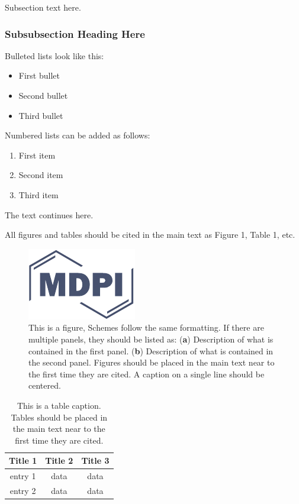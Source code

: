 \documentclass[sensors,article,submit,moreauthors,pdftex]{mdpi}
\providecommand{\tightlist}{%
  \setlength{\itemsep}{0pt}\setlength{\parskip}{4pt}}
\begin{document}
Subsection text here.

\subsubsection{Subsubsection Heading
Here}\label{subsubsection-heading-here}

Bulleted lists look like this:

\begin{itemize}
\tightlist
\item
  First bullet
\item
  Second bullet
\item
  Third bullet
\end{itemize}

Numbered lists can be added as follows:

\begin{enumerate}
\def\labelenumi{\arabic{enumi}.}
\tightlist
\item
  First item
\item
  Second item
\item
  Third item
\end{enumerate}

The text continues here.

All figures and tables should be cited in the main text as Figure 1,
Table 1, etc.

\begin{figure}[H]
\centering
\includegraphics[width=3 cm]{logo-mdpi}
\caption{This is a figure, Schemes follow the same formatting. If there are multiple panels, they should be listed as: (\textbf{a}) Description of what is contained in the first panel. (\textbf{b}) Description of what is contained in the second panel. Figures should be placed in the main text near to the first time they are cited. A caption on a single line should be centered.}
\end{figure}

\begin{table}[H]
\caption{This is a table caption. Tables should be placed in the main text near to the first time they are cited.}
\centering
\begin{tabular}{ccc}
\toprule
\textbf{Title 1}    & \textbf{Title 2}  & \textbf{Title 3}\\
\midrule
entry 1     & data          & data\\
entry 2     & data          & data\\
\bottomrule
\end{tabular}
\end{table}
\end{document}
